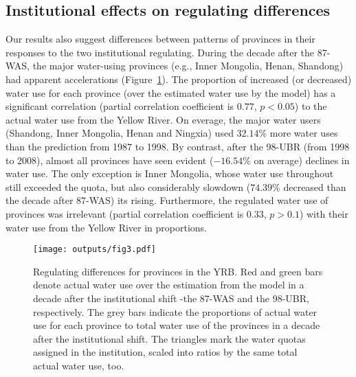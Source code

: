\subsection{Institutional effects on regulating differences}
\label{result-3}
Our results also suggest differences between patterns of provinces in their responses to the two institutional regulating.
During the decade after the 87-WAS, the major water-using provinces (e.g., Inner Mongolia, Henan, Shandong) had apparent accelerations (Figure~\ref{regulating}).
The proportion of increased (or decreased) water use for each province (over the estimated water use by the model) has a significant correlation (partial correlation coefficient is $0.77$, $p<0.05$) to the actual water use from the Yellow River.
On everage, the major water users (Shandong, Inner Mongolia, Henan and Ningxia) used $32.14\%$ more water uses than the prediction from 1987 to 1998.
By contrast, after the 98-UBR (from 1998 to 2008), almost all provinces have seen evident ($-16.54\%$ on average) declines in water use.
The only exception is Inner Mongolia, whose water use throughout still exceeded the quota, but also considerably slowdown ($74.39\%$ decreased than the decade after 87-WAS) its rising.
Furthermore, the regulated water use of provinces was irrelevant (partial correlation coefficient is $0.33$, $p>0.1$) with their water use from the Yellow River in proportions.

\begin{figure*}[!tb]
    \centering
    \texttt{[image: outputs/fig3.pdf]}
    \caption{
        Regulating differences for provinces in the YRB.
        Red and green bars denote actual water use over the estimation from the model in a decade after the institutional shift -the 87-WAS and the 98-UBR, respectively.
        The grey bars indicate the proportions of actual water use for each province to total water use of the provinces in a decade after the institutional shift.
        The triangles mark the water quotas assigned in the institution, scaled into ratios by the same total actual water use, too.
    }
    \label{regulating}
\end{figure*}

